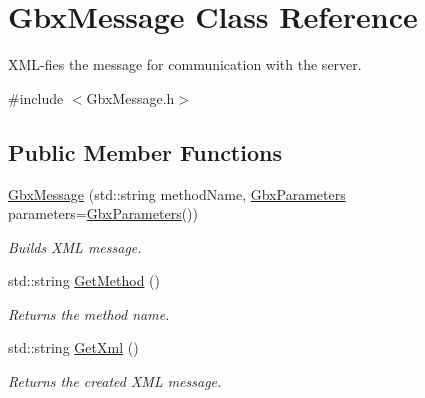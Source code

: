 \hypertarget{classGbxMessage}{\section{Gbx\-Message Class Reference}
\label{classGbxMessage}
}


X\-M\-L-\/fies the message for communication with the server.  




{\ttfamily \#include $<$Gbx\-Message.\-h$>$}

\subsection*{Public Member Functions}
\begin{DoxyCompactItemize}
\item 
\hyperlink{classGbxMessage_a843b7642b48be23073a4b981f80f95b7}{Gbx\-Message} (std\-::string method\-Name, \hyperlink{classGbxParameters}{Gbx\-Parameters} parameters=\hyperlink{classGbxParameters}{Gbx\-Parameters}())
\begin{DoxyCompactList}\small\item\em Builds X\-M\-L message. \end{DoxyCompactList}\item 
\hypertarget{classGbxMessage_a53e00a162c293251bef476ad74d0134c}{std\-::string \hyperlink{classGbxMessage_a53e00a162c293251bef476ad74d0134c}{Get\-Method} ()}\label{classGbxMessage_a53e00a162c293251bef476ad74d0134c}

\begin{DoxyCompactList}\small\item\em Returns the method name. \end{DoxyCompactList}\item 
\hypertarget{classGbxMessage_ac81e16efce7da483a696d6653e18c9d8}{std\-::string \hyperlink{classGbxMessage_ac81e16efce7da483a696d6653e18c9d8}{Get\-Xml} ()}\label{classGbxMessage_ac81e16efce7da483a696d6653e18c9d8}

\begin{DoxyCompactList}\small\item\em Returns the created X\-M\-L message. \end{DoxyCompactList}\end{DoxyCompactItemize}
